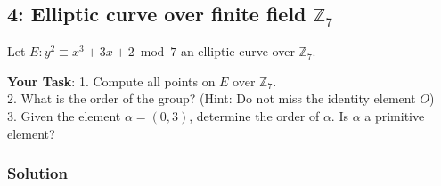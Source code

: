 \documentclass[11pt]{article}
\begin{document}
\newpage

    \hypertarget{elliptic-curve-over-finite-field-mathbbz_7}{%
\subsection{\texorpdfstring{4: Elliptic curve over finite field
\(\mathbb{Z}_7\)}{4 Elliptic curve over finite field \textbackslash{}mathbb\{Z\}\_7}}\label{elliptic-curve-over-finite-field-mathbbz_7}}

Let \(E : y^2 \equiv x^3 +3x+2 \bmod 7\) an elliptic curve over
\(\mathbb{Z}_7\).

\textbf{Your Task}: 1. Compute all points on \(E\) over
\(\mathbb{Z}_7\).  \\
2. What is the order of the group? (Hint: Do not miss
the identity element \(O\)) \\
3. Given the element \(\alpha = (0,3)\),
determine the order of \(\alpha\). Is \(\alpha\) a primitive element?

\hypertarget{solution}{%
\subsubsection{Solution}\label{solution}}
\end{document}
